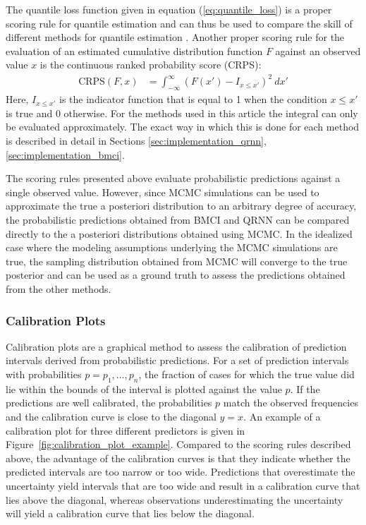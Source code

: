 \documentclass[journal abbreviation, manuscript]{copernicus}
\begin{document}
The quantile loss function given in equation (\ref{eq:quantile_loss}) is a
proper scoring rule for quantile estimation and can thus be used to compare the
skill of different methods for quantile estimation \citep{gneiting}. Another
proper scoring rule for the evaluation of an estimated cumulative distribution
function $F$ against an observed value $x$ is the continuous ranked probability
score (CRPS):
  \begin{align}\label{eq:crps}
    \text{CRPS}(F, x) &= \int_{-\infty}^{\infty} \left ( F(x') - I_{x \leq x'}
    \right )^2 \: dx'
  \end{align}
  Here, $I_{x \leq x'}$ is the indicator function that is equal to 1 when
  the condition $x \leq x'$ is true and $0$ otherwise.
  For the methods used in this article the integral can only be evaluated
  approximately. The exact way in which this is done for each method is
  described in detail in Sections \ref{sec:implementation_qrnn},
  \ref{sec:implementation_bmci}.

  The scoring rules presented above evaluate probabilistic predictions against a
  single observed value. However, since MCMC simulations can be used to
  approximate the true a posteriori distribution to an arbitrary degree of
  accuracy, the probabilistic predictions obtained from BMCI and QRNN can be
  compared directly to the a posteriori distributions obtained using MCMC. In
  the idealized case where the modeling assumptions underlying the MCMC
  simulations are true, the sampling distribution obtained from MCMC will
  converge to the true posterior and can be used as a ground truth to assess the
  predictions obtained from the other methods.
  
\subsubsection{Calibration Plots} 

Calibration plots are a graphical method to assess the calibration of prediction
intervals derived from probabilistic predictions. For a set of prediction
intervals with probabilities $p = p_1, \dots, p_n$, the fraction of cases
for which the true value did lie within the bounds of the interval is plotted
against the value $p$. If the predictions are well calibrated, the probabilities
$p$ match the observed frequencies and the calibration curve is close to the
diagonal $y = x$. An example of a calibration plot for three different
predictors is given in Figure~\ref{fig:calibration_plot_example}. Compared to the
scoring rules described above, the advantage of the calibration curves is that
they indicate whether the predicted intervals are too narrow or too wide.
Predictions that overestimate the uncertainty yield intervals that are too wide and
result in a calibration curve that lies above the diagonal, whereas observations
underestimating the uncertainty will yield a calibration curve that lies below
the diagonal.
\end{document}
